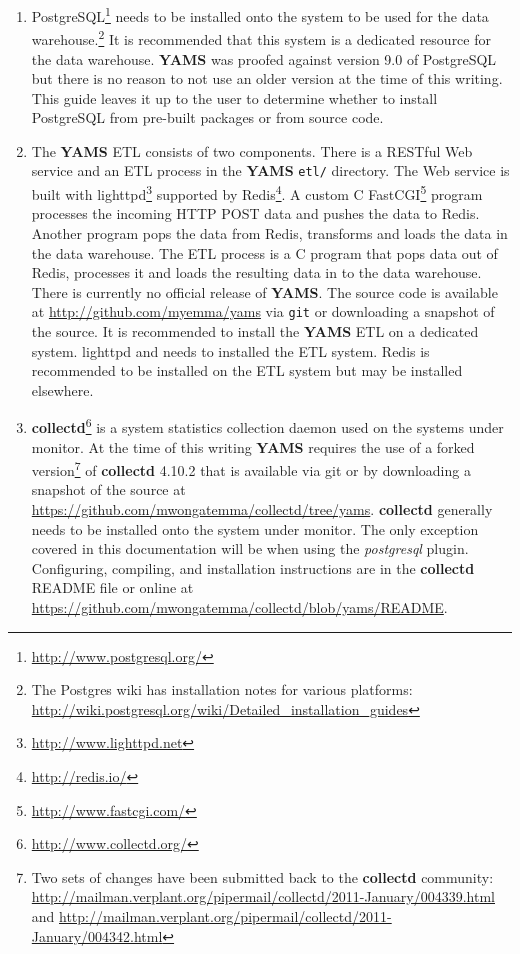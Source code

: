 \documentclass[a4paper,twoside,12pt]{article}
\begin{document}
\begin{enumerate}
  \item PostgreSQL\footnote{\url{http://www.postgresql.org/}} needs to be
        installed onto the system to be used for the data
        warehouse.\footnote{The Postgres wiki has installation notes for
        various platforms:
        \url{http://wiki.postgresql.org/wiki/Detailed_installation_guides}} It
        is recommended that this system is a dedicated resource for the data
        warehouse.  \textbf{YAMS} was proofed against version 9.0 of PostgreSQL
        but there is no reason to not use an older version at the time of this
        writing.  This guide leaves it up to the user to determine whether to
        install PostgreSQL from pre-built packages or from source code.
  \item The \textbf{YAMS} ETL consists of two components.  There is a RESTful
        Web service and an ETL process in the \textbf{YAMS} \texttt{etl/}
        directory.  The Web service is built with
        lighttpd\footnote{\url{http://www.lighttpd.net}} supported by
        Redis\footnote{\url{http://redis.io/}}.  A custom C
        FastCGI\footnote{\url{http://www.fastcgi.com/}} program processes the
        incoming HTTP POST data and pushes the data to Redis.  Another program
        pops the data from Redis, transforms and loads the data in the data
        warehouse.  The ETL process is a C program that pops data out of Redis,
        processes it and loads the resulting data in to the data warehouse.
        There is currently no official release of \textbf{YAMS}.  The source
        code is available at \url{http://github.com/myemma/yams} via
        \texttt{git} or downloading a snapshot of the source.  It is
        recommended to install the \textbf{YAMS} ETL on a dedicated system.
        lighttpd and needs to installed the ETL system.  Redis is recommended
        to be installed on the ETL system but may be installed elsewhere.
  \item \textbf{collectd}\footnote{\url{http://www.collectd.org/}} is a system
        statistics collection daemon used on the systems under monitor.  At the
        time of this writing \textbf{YAMS} requires the use of a forked
        version\footnote{Two sets of changes have been submitted back to the
        \textbf{collectd} community:
        \url{http://mailman.verplant.org/pipermail/collectd/2011-January/004339.html}
        and
        \url{http://mailman.verplant.org/pipermail/collectd/2011-January/004342.html}}
        of \textbf{collectd} 4.10.2 that is available via git or by downloading
        a snapshot of the source at
        \url{https://github.com/mwongatemma/collectd/tree/yams}.
        \textbf{collectd} generally needs to be installed onto the system under
        monitor.  The only exception covered in this documentation will be when
        using the \textit{postgresql} plugin.  Configuring, compiling, and
        installation instructions are in the \textbf{collectd} README file or
        online at
        \url{https://github.com/mwongatemma/collectd/blob/yams/README}.

\end{enumerate}
\end{document}
